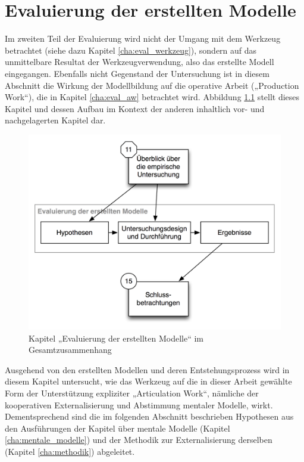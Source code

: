 

\chapter{Evaluierung der erstellten Modelle} %
\label{cha:eval_modell}

Im zweiten Teil der Evaluierung wird nicht der Umgang mit dem Werkzeug betrachtet (siehe dazu Kapitel \ref{cha:eval_werkzeug}), sondern auf das unmittelbare Resultat der Werkzeugverwendung, also das erstellte Modell eingegangen. Ebenfalls nicht Gegenstand der Untersuchung ist in diesem Abschnitt die Wirkung der Modellbildung auf die operative Arbeit („Production Work“), die in Kapitel \ref{cha:eval_aw} betrachtet wird. Abbildung \ref{fig:img_Kontextgrafiken_k13} stellt dieses Kapitel und dessen Aufbau im Kontext der anderen inhaltlich vor- und nachgelagerten Kapitel dar.


\begin{figure}[htbp]
	\centering
		\includegraphics[scale=0.6]{img/Kontextgrafiken/k13.png}
	\caption{Kapitel „Evaluierung der erstellten Modelle“ im Gesamtzusammenhang}
	\label{fig:img_Kontextgrafiken_k13}
\end{figure}


Ausgehend von den erstellten Modellen und deren Entstehungsprozess wird in diesem Kapitel untersucht, wie das Werkzeug auf die in dieser Arbeit gewählte Form der Unterstützung expliziter „Articulation Work“, nämliche der kooperativen Externalisierung und Abstimmung mentaler Modelle, wirkt. Dementsprechend sind die im folgenden Abschnitt beschrieben Hypothesen aus den Ausführungen der Kapitel über mentale Modelle (Kapitel \ref{cha:mentale_modelle}) und der Methodik zur Externalisierung derselben (Kapitel \ref{cha:methodik}) abgeleitet. 

